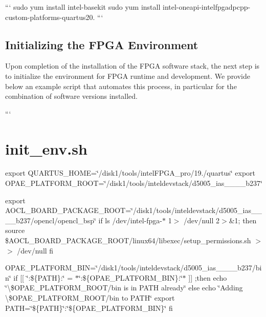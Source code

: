 ``` sudo yum install intel-\/basekit sudo yum install intel-\/oneapi-\/intelfpgadpcpp-\/custom-\/platforms-\/quartus20. ```

\subsection*{Initializing the F\-P\-G\-A Environment}

Upon completion of the installation of the F\-P\-G\-A software stack, the next step is to initialize the environment for F\-P\-G\-A runtime and development. We provide below an example script that automates this process, in particular for the combination of software versions installed. \par


``` \section*{init\-\_\-env.\-sh}

export Q\-U\-A\-R\-T\-U\-S\-\_\-\-H\-O\-M\-E=\char`\"{}/disk1/tools/intel\-F\-P\-G\-A\-\_\-pro/19./quartus\char`\"{} export O\-P\-A\-E\-\_\-\-P\-L\-A\-T\-F\-O\-R\-M\-\_\-\-R\-O\-O\-T=\char`\"{}/disk1/tools/inteldevstack/d5005\-\_\-ias\-\_\-\_\-\_\-\_\-b237\char`\"{}

export A\-O\-C\-L\-\_\-\-B\-O\-A\-R\-D\-\_\-\-P\-A\-C\-K\-A\-G\-E\-\_\-\-R\-O\-O\-T=\char`\"{}/disk1/tools/inteldevstack/d5005\-\_\-ias\-\_\-\_\-\_\-\_\-b237/opencl/opencl\-\_\-bsp\char`\"{} if ls /dev/intel-\/fpga-\/$\ast$ 1$>$ /dev/null 2$>$\&1; then source \$\-A\-O\-C\-L\-\_\-\-B\-O\-A\-R\-D\-\_\-\-P\-A\-C\-K\-A\-G\-E\-\_\-\-R\-O\-O\-T/linux64/libexec/setup\-\_\-permissions.sh $>$$>$ /dev/null fi

O\-P\-A\-E\-\_\-\-P\-L\-A\-T\-F\-O\-R\-M\-\_\-\-B\-I\-N=\char`\"{}/disk1/tools/inteldevstack/d5005\-\_\-ias\-\_\-\_\-\_\-\_\-b237/bin\char`\"{} if \mbox{[}\mbox{[} \char`\"{}\-:\$\{\-P\-A\-T\-H\}\-:\char`\"{} = $\ast$\char`\"{}\-:\$\{\-O\-P\-A\-E\-\_\-\-P\-L\-A\-T\-F\-O\-R\-M\-\_\-\-B\-I\-N\}\-:\char`\"{}$\ast$ \mbox{]}\mbox{]} ;then echo \char`\"{}\textbackslash{}\$\-O\-P\-A\-E\-\_\-\-P\-L\-A\-T\-F\-O\-R\-M\-\_\-\-R\-O\-O\-T/bin is in P\-A\-T\-H already\char`\"{} else echo \char`\"{}\-Adding \textbackslash{}\$\-O\-P\-A\-E\-\_\-\-P\-L\-A\-T\-F\-O\-R\-M\-\_\-\-R\-O\-O\-T/bin to P\-A\-T\-H\char`\"{} export P\-A\-T\-H=\char`\"{}\$\{\-P\-A\-T\-H\}\char`\"{}\-:\char`\"{}\$\{\-O\-P\-A\-E\-\_\-\-P\-L\-A\-T\-F\-O\-R\-M\-\_\-\-B\-I\-N\}\char`\"{} fi

